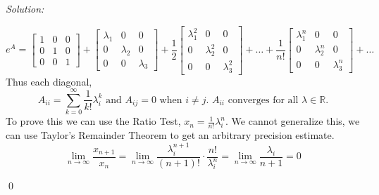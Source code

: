 \documentclass[11 pt]{article}
\newenvironment{sol}
    {\emph{Solution:}
    }
    {
    \qed
    }
\theoremstyle{definition}
\newcommand{\R}{\mathbb{R}} %
\begin{document}
\begin{sol}
\[e^A = \begin{bmatrix}
1 & 0 & 0\\
0 & 1 & 0\\
0 & 0 & 1
\end{bmatrix}
+
\begin{bmatrix}
\lambda_1 & 0 & 0\\
0 & \lambda_2 & 0\\
0 & 0 & \lambda_3
\end{bmatrix}
+
\frac{1}{2}
\begin{bmatrix}
\lambda_1^2 & 0 & 0\\
0 & \lambda_2^2 & 0\\
0 & 0 & \lambda_3^2
\end{bmatrix}+\dots+\frac{1}{n!}\begin{bmatrix}
\lambda_1^n & 0 & 0\\
0 & \lambda_2^n & 0\\
0 & 0 & \lambda_3^n
\end{bmatrix}+\dots\]
Thus each diagonal, \[A_{ii}=\sum_{k=0}^{\infty}\frac{1}{k!}\lambda_i^k\text{ and  }A_{ij}=0\text{ when }i\ne j\text{. $A_{ii}$ converges for all }\lambda\in\R.\]
To prove this we can use the Ratio Test, $x_n=\frac{1}{n!}\lambda_i^n$. We cannot generalize this, we can use Taylor's Remainder Theorem to get an arbitrary precision estimate.
\[\lim_{n\to\infty}\frac{x_{n+1}}{x_n}=\lim_{n\to\infty}\frac{\lambda_i^{n+1}}{(n+1)!}\cdot \frac{n!}{\lambda_i^n}=\lim_{n\to\infty}\frac{\lambda_i}{n+1}=0\]
\end{sol}
\end{document}
